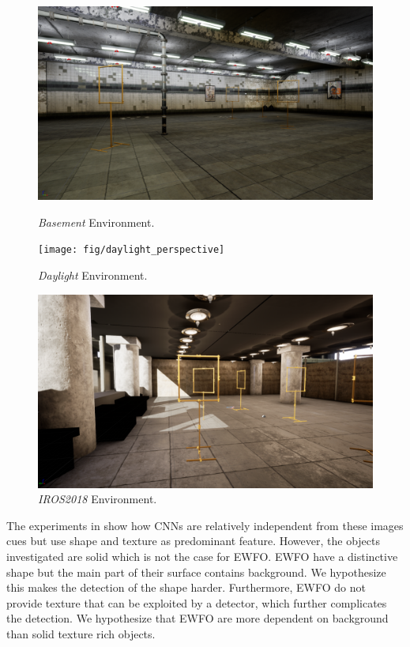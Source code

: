 \begin{figure}[hbtp]
	\centering
	\begin{minipage}{0.8\textwidth}
		\includegraphics[width=\textwidth]{fig/basement_perspective}
	\end{minipage}
	\caption{\textit{Basement} Environment.}
	\begin{minipage}{0.8\textwidth}
		\texttt{[image: fig/daylight\_perspective]}
	\end{minipage}
	\caption{\textit{Daylight} Environment.}
	\begin{minipage}{0.8\textwidth}
		\includegraphics[width=\textwidth]{fig/iros_perspective}
	\end{minipage}
	\caption{\textit{IROS2018} Environment.}
	\label{fig:environments}
\end{figure}

The experiments in \cite{Peng} show how \acp{CNN} are relatively independent from these images cues but use shape and texture as predominant feature. However, the objects investigated are solid which is not the case for \ac{EWFO}. \ac{EWFO} have a distinctive shape but the main part of their surface contains background. We hypothesize this makes the detection of the shape harder. Furthermore, \ac{EWFO} do not provide texture that can be exploited by a detector, which further complicates the detection. We hypothesize that \ac{EWFO} are more dependent on background than solid texture rich objects. 

